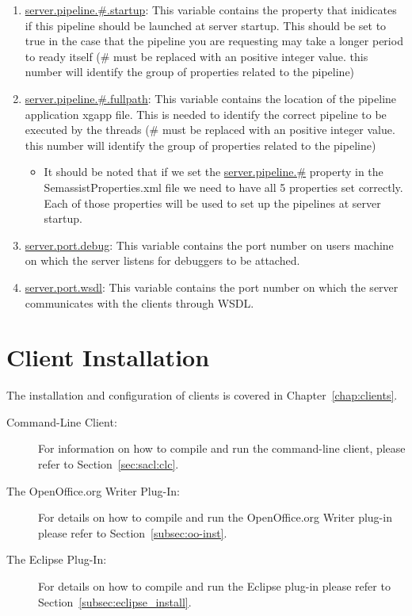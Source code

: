 \begin{enumerate}
\item \url{server.pipeline.\#.startup}: This variable contains the property that inidicates if this pipeline should be launched at server startup.  This should be set to true in the case that the pipeline you are requesting may take a longer period to ready itself  (\# must be replaced with an positive integer value.  this number will identify the group of properties related to the pipeline)
\item \url{server.pipeline.\#.fullpath}: This variable contains the location of the pipeline application xgapp file.  This is needed to identify the correct pipeline to be executed by the threads (\# must be replaced with an positive integer value.  this number will identify the group of properties related to the pipeline)
\begin{itemize}
  \item It should be noted that if we set the \url{server.pipeline.\#} property in the SemassistProperties.xml file we need to have all 5 properties set correctly.  Each of those properties will be used to set up the pipelines at server startup.
\end{itemize}
\item \url{server.port.debug}: This variable contains the port number on users machine on which the server listens for debuggers to be attached.
\item \url{server.port.wsdl}: This variable contains the port number on which the server communicates with the clients through WSDL.
\end{enumerate}


\section{Client Installation}
The installation and configuration of clients is covered in
Chapter~\ref{chap:clients}.

\begin{description}
\item[Command-Line Client:] For information on how to compile and run
  the command-line client, please refer to Section~\ref{sec:sacl:clc}.

\item[The OpenOffice.org Writer Plug-In:] For details on how to
  compile and run the OpenOffice.org Writer plug-in please refer to
  Section~\ref{subsec:oo-inst}.

\item[The Eclipse Plug-In:] For details on how to
  compile and run the Eclipse plug-in please refer to
  Section~\ref{subsec:eclipse_install}.
\end{description}









